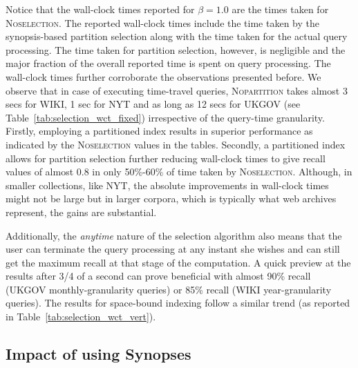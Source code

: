 Notice that the wall-clock times reported for $\beta = 1.0$ are the times taken for \textsc{Noselection}. The reported wall-clock times include the time taken by the synopsis-based partition selection along with the time taken for the actual query processing. The time taken for partition selection, however, is negligible and the major fraction of the overall reported time is spent on query processing. The wall-clock times further corroborate the observations presented before. We observe that in case of executing time-travel queries, \textsc{Nopartition} takes almost 3 secs for WIKI, 1 sec for NYT and as long as 12 secs for UKGOV (see Table~\ref{tab:selection_wct_fixed}) irrespective of the query-time granularity. Firstly, employing a partitioned index results in superior performance as indicated by the \textsc{Noselection} values in the tables. Secondly, a partitioned index allows for partition selection further reducing wall-clock times to give recall values of almost 0.8 in only 50\%-60\% of time taken by \textsc{Noselection}. Although, in smaller collections, like NYT, the absolute improvements in wall-clock times might not be large but in larger corpora, which is typically what web archives represent, the gains are substantial. 

Additionally, the \emph{anytime} nature of the selection algorithm also means that the user can terminate the query processing at any instant she wishes and can still get the maximum recall at that stage of the computation. A quick preview at the results after 3/4 of a second can prove beneficial with almost 90\% recall (UKGOV monthly-granularity queries) or 85\% recall (WIKI year-granularity queries). The results for space-bound indexing follow a similar trend (as reported in Table~\ref{tab:selection_wct_vert}).


\subsection{Impact of using Synopses}

